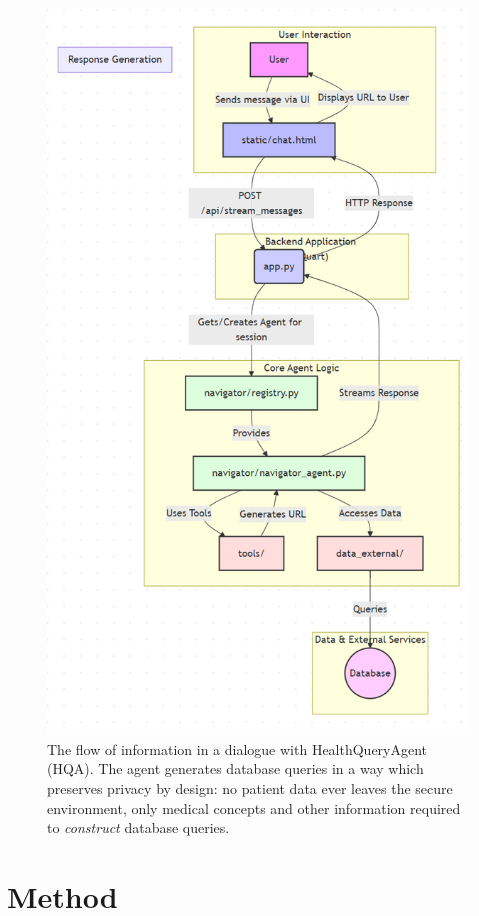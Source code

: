 \documentclass[11pt]{article}
\begin{document}
\begin{figure}[t]
  \includegraphics[width=0.9\columnwidth]{content/flow_diagram.PNG}
	\caption{The flow of information in a dialogue with HealthQueryAgent (HQA). The agent generates database queries in a way which preserves privacy by design: no patient data ever leaves the secure environment, only medical concepts and other information required to \textit{construct} database queries.} 
  \label{fig:flow-diagram}
\end{figure}


\section{Method}
\end{document}
